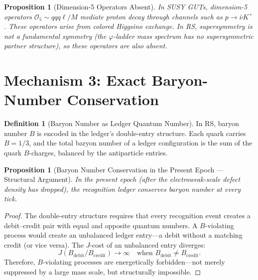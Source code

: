 \documentclass[12pt,a4paper]{article}
\newtheorem{proposition}[theorem]{Proposition}
\theoremstyle{definition}
\newtheorem{definition}[theorem]{Definition}
\theoremstyle{remark}
\begin{document}
\begin{proposition}[Dimension-5 Operators Absent]
\label{prop:dim5}
In SUSY GUTs, dimension-5 operators
$\mathcal{O}_5 \sim qqq\ell / M$ mediate proton decay
through channels such as $p \to \bar{\nu} K^+$.  These
operators arise from colored Higgsino exchange.  In RS,
supersymmetry is not a fundamental symmetry (the
$\varphi$-ladder mass spectrum has no supersymmetric
partner structure), so these operators are also absent.
\end{proposition}

\section{Mechanism 3: Exact Baryon-Number Conservation}
\label{sec:baryon}

\begin{definition}[Baryon Number as Ledger Quantum Number]
\label{def:baryon}
In RS, baryon number $B$ is encoded in the ledger's
double-entry structure.  Each quark carries $B = 1/3$, and
the total baryon number of a ledger configuration is the
sum of the quark $B$-charges, balanced by the antiparticle
entries.
\end{definition}

\begin{proposition}[Baryon Number Conservation in the Present Epoch --- Structural Argument]
\label{thm:b-conservation}
In the present epoch (after the electroweak-scale defect
density has dropped), the recognition ledger conserves baryon
number at every tick.
\end{proposition}

\begin{proof}
The double-entry structure requires that every recognition
event creates a debit--credit pair with equal and opposite
quantum numbers.  A $B$-violating process would create an
unbalanced ledger entry---a debit without a matching credit
(or vice versa).  The $J$-cost of an unbalanced entry
diverges:
\begin{equation}
  J(B_{\mathrm{debit}} / B_{\mathrm{credit}}) \to \infty
  \quad \text{when } B_{\mathrm{debit}} \neq
  B_{\mathrm{credit}}.
\end{equation}
Therefore, $B$-violating processes are energetically
forbidden---not merely suppressed by a large mass scale,
but structurally impossible.
\end{proof}
\end{document}
